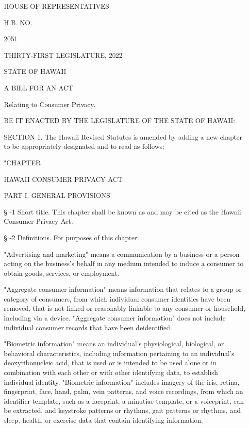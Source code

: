 HOUSE OF REPRESENTATIVES

H.B. NO.

2051

THIRTY-FIRST LEGISLATURE, 2022

 

STATE OF HAWAII

 

 

 

 

 

 

A BILL FOR AN ACT

 

 

Relating to Consumer Privacy.

 

 

BE IT ENACTED BY THE LEGISLATURE OF THE STATE OF HAWAII:

 


     SECTION 1.  The Hawaii Revised Statutes is amended by adding a new chapter to be appropriately designated and to read as follows:

"CHAPTER

HAWAII CONSUMER PRIVACY ACT

PART I.  GENERAL PROVISIONS

     §   -1  Short title.  This chapter shall be known as and may be cited as the Hawaii Consumer Privacy Act.

     §   -2  Definitions.  For purposes of this chapter:

     "Advertising and marketing" means a communication by a business or a person acting on the business's behalf in any medium intended to induce a consumer to obtain goods, services, or employment.

     "Aggregate consumer information" means information that relates to a group or category of consumers, from which individual consumer identities have been removed, that is not linked or reasonably linkable to any consumer or household, including via a device.  "Aggregate consumer information" does not include individual consumer records that have been deidentified.

     "Biometric information" means an individual's physiological, biological, or behavioral characteristics, including information pertaining to an individual's deoxyribonucleic acid, that is used or is intended to be used alone or in combination with each other or with other identifying data, to establish individual identity.  "Biometric information" includes imagery of the iris, retina, fingerprint, face, hand, palm, vein patterns, and voice recordings, from which an identifier template, such as a faceprint, a minutiae template, or a voiceprint, can be extracted, and keystroke patterns or rhythms, gait patterns or rhythms, and sleep, health, or exercise data that contain identifying information.

